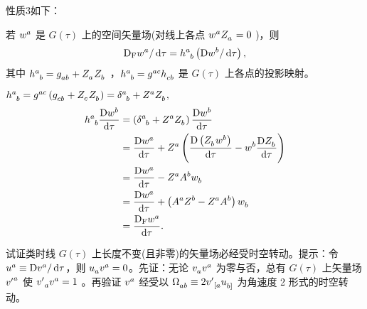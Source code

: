 \begin{xiti}
    \begin{zm}
    	性质3如下：
    	\begin{Property}
    		若 $\tensor{w}{^a}$ 是 $G(\tau)$ 上的空间矢量场(对线上各点 $\tensor{w}{^a} \tensor{Z}{_a} = 0$ )，则 \[ \Fdd{\tensor{w}{^a}} = \tensor{h}{^a_b} \left( \Ddd{\tensor{w}{^b}} \right), \] 其中 $\tensor{h}{^a_b} = \tensor{g}{_a_b} + \tensor{Z}{_a} \tensor{Z}{_b}$ ，$\tensor{h}{^a_b} = \tensor{g}{^a^c} \tensor{h}{_c_b}$ 是 $G(\tau)$ 上各点的投影映射。
    	\end{Property}
    	\begin{Proof}
    		$\tensor{h}{^a_b} = \tensor{g}{^a^c} \left( \tensor{g}{_c_b} + \tensor{Z}{_c} \tensor{Z}{_b} \right) = \tensor{\delta}{^a_b} + \tensor{Z}{^a} \tensor{Z}{_b},$
    		\begin{align*}
    		\tensor{h}{^a_b} \Dd{\tensor{w}{^b}} &= \left( \tensor{\delta}{^a_b} + \tensor{Z}{^a} \tensor{Z}{_b} \right) \Dd{\tensor{w}{^b}}\\
    		&= \Dd{\tensor{w}{^a}} + \tensor{Z}{^a} \left( \Dd{\left( \tensor{Z}{_b} \tensor{w}{^b} \right)} - \tensor{w}{^b} \Dd{\tensor{Z}{_b}} \right)\\
    		&= \Dd{\tensor{w}{^a}} - \tensor{Z}{^a} \tensor{A}{^b} \tensor{w}{_b}\\
    		&= \Dd{\tensor{w}{^a}} + \left(\tensor{A}{^a} \tensor{Z}{^b} - \tensor{Z}{^a} \tensor{A}{^b}\right) \tensor{w}{_b}\\
    		&= \Fd{\tensor{w}{^a}}.
    		\end{align*}
    	\end{Proof}
    \end{zm}

    \item 试证类时线 $G(\tau)$ 上长度不变(且非零)的矢量场必经受时空转动。提示：令 $\tensor{u}{^a} \equiv \Ddd{\tensor{v}{^a}}$，则 $\tensor{u}{_a} \tensor{v}{^a}=0$。先证：无论 $\tensor{v}{_a}\tensor{v}{^a}$ 为零与否，总有 $G(\tau)$ 上矢量场 $\tensor{{v'}}{^a}$ 使 $\tensor{{v'}}{_a} \tensor{v}{^a} = 1$ 。再验证 $\tensor{v}{^a}$ 经受以 $\tensor{\Omega}{_a_b} \equiv 2 \tensor{{v'}}{_{[a}} \tensor{u}{_{b]}}$ 为角速度 2 形式的时空转动。


\end{xiti}

